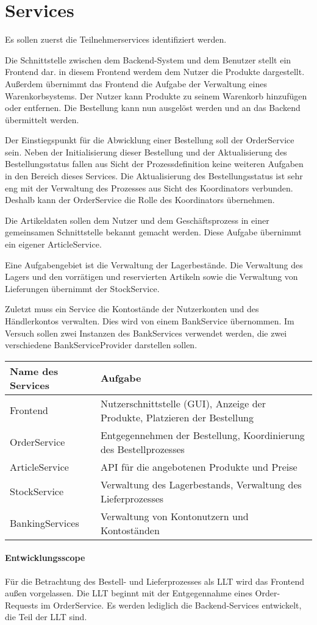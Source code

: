 \section{Services} \label{sec_Services}
Es sollen zuerst die Teilnehmerservices identifiziert werden. 

Die Schnittstelle zwischen dem Backend-System und dem Benutzer stellt ein Frontend dar. in diesem Frontend werdem dem Nutzer die Produkte dargestellt. Außerdem übernimmt das Frontend die Aufgabe der Verwaltung eines Warenkorbsystems. Der Nutzer kann Produkte zu seinem Warenkorb hinzufügen oder entfernen. Die Bestellung kann nun ausgelöst werden und an das Backend übermittelt werden. 

Der Einstiegspunkt für die Abwicklung einer Bestellung soll der OrderService sein. Neben der Initialisierung dieser Bestellung und der Aktualisierung des Bestellungsstatus fallen aus Sicht der Prozessdefinition keine weiteren Aufgaben in den Bereich dieses Services. Die Aktualisierung des Bestellungsstatus ist sehr eng mit der Verwaltung des Prozesses aus Sicht des Koordinators verbunden. Deshalb kann der OrderService die Rolle des Koordinators übernehmen. 

Die Artikeldaten sollen dem Nutzer und dem Geschäftsprozess in einer gemeinsamen Schnittstelle bekannt gemacht werden. Diese Aufgabe übernimmt ein eigener ArticleService. 

Eine Aufgabengebiet ist die Verwaltung der Lagerbestände. Die Verwaltung des Lagers und den vorrätigen und reservierten Artikeln sowie die Verwaltung von Lieferungen übernimmt der StockService. 

Zuletzt muss ein Service die Kontostände der Nutzerkonten und des Händlerkontos verwalten. Dies wird von einem BankService übernommen. Im Versuch sollen zwei Instanzen des BankServices verwendet werden, die zwei verschiedene BankServiceProvider darstellen sollen. 

\begin{center}
	\begin{tabular}[h]{|p{3.5cm}|p{12cm}|}
		\hline
		Name des Services & Aufgabe \\ \hline
		Frontend & Nutzerschnittstelle (GUI), Anzeige der Produkte, Platzieren der Bestellung \\ \hline
		OrderService & Entgegennehmen der Bestellung, Koordinierung des Bestellprozesses \\ \hline
		ArticleService & API für die angebotenen Produkte und Preise \\ \hline
		StockService & Verwaltung des Lagerbestands, Verwaltung des Lieferprozesses \\ \hline
		BankingServices & Verwaltung von Kontonutzern und Kontoständen \\ \hline
	\end{tabular}
\end{center}

\paragraph*{Entwicklungsscope}
Für die Betrachtung des Bestell- und Lieferprozesses als LLT wird das Frontend außen vorgelassen. Die LLT beginnt mit der Entgegennahme eines Order-Requests im OrderService. Es werden lediglich die Backend-Services entwickelt, die Teil der LLT sind.